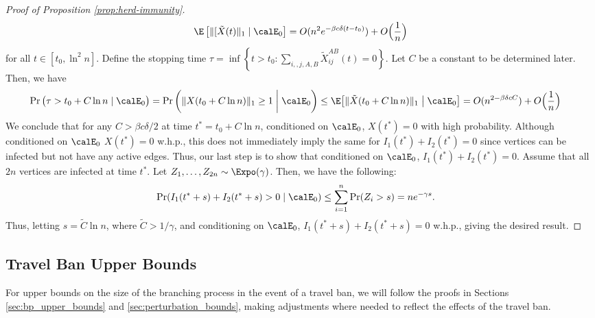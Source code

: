 \documentclass[11pt]{article}
\begin{document}
\begin{proof}[Proof of  Proposition \ref{prop:herd-immunity}]
  \begin{equation}\label{eq:x_tilde_bound}
   \E\left[ \| [ \tilde X(t)\|_1\mid \calE_0\right]=O(n^2e^{-\beta c\delta(t-t_0)})+ O\Big(\frac 1n\Big)
    \end{equation}
    for all $t\in [t_0,\ln^2 n]$.
    Define the stopping time $\tau = \inf \left\{t > t_0: \sum_{i,, j, A, B} \tilde X_{ij}^{AB}(t) = 0\right\}$. Let $C$ be a constant to be determined later. Then, we have 
    \begin{align*}
        \Pr\big(\tau > t_0 + C\ln n \mid \calE_0\big) & = \Pr\bigg(\| X(t_0 + C\ln n)\|_1 \geq 1\;\bigg|\; \calE_0\bigg)
        \leq \E\big[\|\tilde X(t_0 + C\ln n)\|_1\;\big|\;\calE_0\big]
        =O(n^{2-\beta\delta c C})+O\Big(\frac 1n\Big)
    \end{align*}
We conclude that for any $C > \beta c\delta/2$ at time $t^* = t_0 + C\ln n$, conditioned on $\calE_0$, $X(t^*) = 0$ with high probability. Although conditioned on $\calE_0$ $X(t^*) = 0$ w.h.p., this does not immediately imply the same for $I_1(t^*) + I_2(t^*) = 0$ since vertices can be infected but not have any active edges. Thus, our last step is to show that conditioned on $\calE_0$, $I_1(t^*) + I_2(t^*) = 0$. Assume that all $2n$ vertices are infected at time $t^*$. Let $Z_1, \dots, Z_{2n} \sim \Expo(\gamma)$. Then, we have the following:
\begin{align*}
    \Pr(I_1(t^*+s) + I_2(t^*+s) > 0 \mid \calE_0) &\leq \sum_{i=1}^n \Pr(Z_i > s) = ne^{-\gamma s}.
\end{align*}
Thus, letting $s = \tilde C\ln n$, where $\tilde C > 1/\gamma$, and conditioning on $\calE_0$, $I_1(t^*+s) + I_2(t^*+s) =0 $ w.h.p., giving the desired result.
\end{proof}

\subsection{Travel Ban Upper Bounds}
\label{sec;BP-travelban-upper-bd}

For upper bounds on the size of the branching process in the event of a travel ban, we will follow the proofs in Sections \ref{sec:bp_upper_bounds} and \ref{sec:perturbation_bounds}, making adjustments where needed to reflect the effects of the travel ban.
\end{document}
